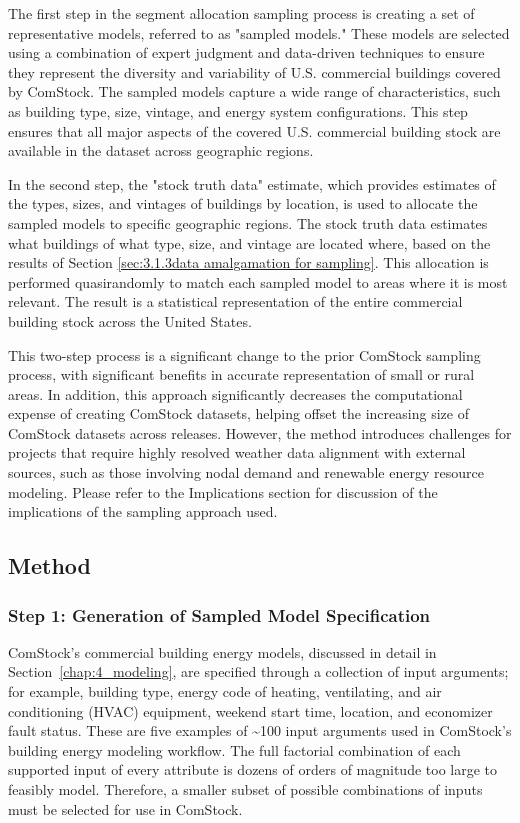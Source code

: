 The first step in the segment allocation sampling process is creating a set of representative models, referred to as "sampled models." These models are selected using a combination of expert judgment and data-driven techniques to ensure they represent the diversity and variability of U.S. commercial buildings covered by ComStock. The sampled models capture a wide range of characteristics, such as building type, size, vintage, and energy system configurations. This step ensures that all major aspects of the covered U.S. commercial building stock are available in the dataset across geographic regions.

In the second step, the "stock truth data" estimate, which provides estimates of the types, sizes, and vintages of buildings by location, is used to allocate the sampled models to specific geographic regions. The stock truth data estimates what buildings of what type, size, and vintage are located where, based on the results of Section \ref{sec:3.1.3data amalgamation for sampling}. This allocation is performed quasirandomly to match each sampled model to areas where it is most relevant. The result is a statistical representation of the entire commercial building stock across the United States.

This two-step process is a significant change to the prior ComStock sampling process, with significant benefits in accurate representation of small or rural areas. In addition, this approach significantly decreases the computational expense of creating ComStock datasets, helping offset the increasing size of ComStock datasets across releases. However, the method introduces challenges for projects that require highly resolved weather data alignment with external sources, such as those involving nodal demand and renewable energy resource modeling. Please refer to the Implications section for discussion of the implications of the sampling approach used.

\subsection{Method}
\subsubsection{Step 1: Generation of Sampled Model Specification}
ComStock's commercial building energy models, discussed in detail in Section~\ref{chap:4_modeling}, are specified through a collection of input arguments; for example, building type, energy code of heating, ventilating, and air conditioning (HVAC) equipment, weekend start time, location, and economizer fault status. These are five examples of \textasciitilde100 input arguments used in ComStock's building energy modeling workflow. The full factorial combination of each supported input of every attribute is dozens of orders of magnitude too large to feasibly model. Therefore, a smaller subset of possible combinations of inputs must be selected for use in ComStock.

